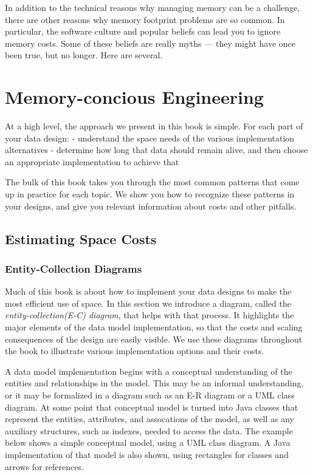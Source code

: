 In addition to the technical reasons why managing memory can be a challenge, there
are other reasons why memory footprint problems are so common. In particular,
the software culture and popular beliefs can lead you to ignore memory
costs. Some of these beliefs are really myths --- they might have once
been true, but no longer. Here are several.

\section{Memory-concious Engineering}

At a high level, the approach we present in this book is simple. For each part of your data design:
- understand the space needs of the various implementation alternatives
- determine how long that data should remain alive, and then choose an appropriate implementation to achieve that

The bulk of this book takes you through the most common patterns that come up in practice for each topic. We show you how to recognize
these patterns in your designs, and give you relevant information about costs and other pitfalls.  


\subsection{Estimating Space Costs}




\subsubsection{Entity-Collection Diagrams}

Much of this book is about how to implement your data designs to make the most efficient use of space. In this section we introduce a diagram, called the \emph{entity-collection(E-C) diagram}, that helps with that process. It highlights the major elements of the data model implementation, so that the costs and scaling consequences of the design are easily visible. We use these diagrams throughout the book to illustrate various implementation options and their costs.

A data model implementation begins with a conceptual understanding of the entities and relationships in the model.  This may be an informal understanding, or it may be formalized in a diagram such as an E-R diagram or a UML class diagram.  At some point that conceptual model is turned into Java classes that represent the entities, attributes, and assocations of the model, as well as any auxiliary structures, such as indexes, needed to access the data.  The example below shows a simple conceptual model, using a UML class diagram.  A Java implementation of that model is also shown, using rectangles for classes and arrows for references.  %

